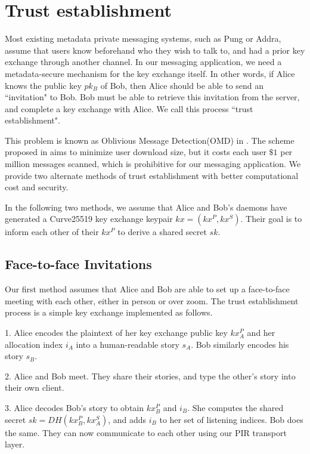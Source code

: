 \section{Trust establishment}
\label{sec:trustestablishment}

Most existing metadata private messaging systems, such as Pung or Addra, assume that users know beforehand who they wish to talk to, and had a prior key exchange through another channel. In our messaging application, we need a metadata-secure mechanism for the key exchange itself. In other words, if Alice knows the public key $pk_B$ of Bob, then Alice should be able to send an ``invitation" to Bob. Bob must be able to retrieve this invitation from the server, and complete a key exchange with Alice. We call this process ``trust establishment".

This problem is known as Oblivious Message Detection(OMD) in \cite{liutromer2021}. The scheme proposed in \cite{liutromer2021} aims to minimize user download size, but it costs each user $\$ 1$ per million messages scanned, which is prohibitive for our messaging application. We provide two alternate methods of trust establishment with better computational cost and security.

In the following two methods, we assume that Alice and Bob's daemons have generated a Curve25519 key exchange keypair $kx = (kx^P, kx^S)$. Their goal is to inform each other of their $kx^P$ to derive a shared secret $sk$.

\subsection{Face-to-face Invitations}
Our first method assumes that Alice and Bob are able to set up a face-to-face meeting with each other, either in person or over zoom. The trust establishment process is a simple key exchange implemented as follows.

1. Alice encodes the plaintext of her key exchange public key $kx_A^P$ and her allocation index $i_A$ into a human-readable story $s_A$. Bob similarly encodes his story $s_B$.

2. Alice and Bob meet. They share their stories, and type the other's story into their own client. 

3. Alice decodes Bob's story to obtain $kx^P_B$ and $i_B$. She computes the shared secret $sk = DH(kx^P_B, kx^S_A)$, and adds $i_B$ to her set of listening indices. Bob does the same. They can now communicate to each other using our PIR transport layer.

